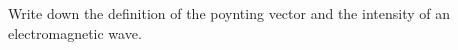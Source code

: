 

\vspace*{\fill}
\centering

Write down the definition of the poynting vector and the intensity of an electromagnetic wave.

\centering
\vspace*{\fill}

